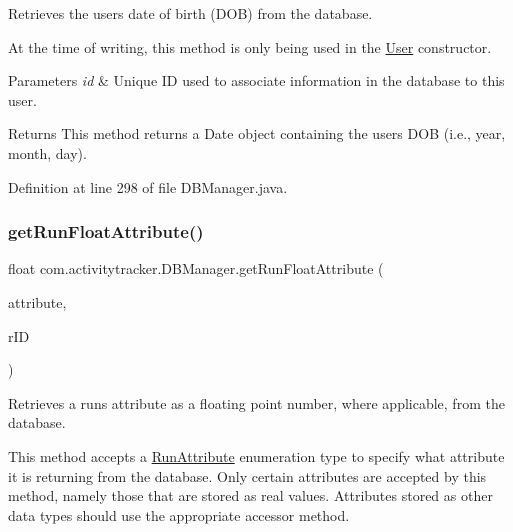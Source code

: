 Retrieves the user\textquotesingle{}s date of birth (D\+OB) from the database.

At the time of writing, this method is only being used in the \mbox{\hyperlink{classcom_1_1activitytracker_1_1_user}{User}} constructor.


\begin{DoxyParams}{Parameters}
{\em id} & Unique ID used to associate information in the database to this user.\\
\hline
\end{DoxyParams}
\begin{DoxyReturn}{Returns}
This method returns a Date object containing the user\textquotesingle{}s D\+OB (i.\+e., year, month, day). 
\end{DoxyReturn}


Definition at line 298 of file D\+B\+Manager.\+java.

\mbox{\label{classcom_1_1activitytracker_1_1_d_b_manager_a666452f1e5862f90c06b0beb9a9fcfdd}} 
\subsubsection{\texorpdfstring{get\+Run\+Float\+Attribute()}{getRunFloatAttribute()}}
{\footnotesize\ttfamily float com.\+activitytracker.\+D\+B\+Manager.\+get\+Run\+Float\+Attribute (\begin{DoxyParamCaption}\item[{final \mbox{\hyperlink{enumcom_1_1activitytracker_1_1_run_attribute}{Run\+Attribute}}}]{attribute,  }\item[{final int}]{r\+ID }\end{DoxyParamCaption})}

Retrieves a run\textquotesingle{}s attribute as a floating point number, where applicable, from the database.

This method accepts a \mbox{\hyperlink{enumcom_1_1activitytracker_1_1_run_attribute}{Run\+Attribute}} enumeration type to specify what attribute it is returning from the database. Only certain attributes are accepted by this method, namely those that are stored as real values. Attributes stored as other data types should use the appropriate accessor method.


